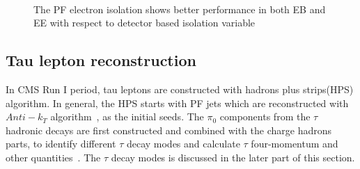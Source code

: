 \begin{figure}[!htbp] 
     \centering
     \\
     \caption[The PF electron isolation shows better performance in both EB and EE with respect to detector based isolation variable]{The PF electron isolation shows better performance in both EB and EE with respect to detector based isolation variable~\cite{electron_reco2015}}
     \label{fig:eleIso}
\end{figure}




\subsection{Tau lepton reconstruction} \label{Chapter:taureco}

In CMS Run I period, tau leptons are constructed with hadrons plus strips(HPS) algorithm. In general, the HPS starts with PF jets which are reconstructed with $Anti-k_{T}$ algorithm~\cite{Cacciari:2008gp}, as the initial seeds. The $\pi_{0}$ components from the $\tau$ hadronic decays are first constructed and combined with the charge hadrons parts, to identify different $\tau$ decay modes and calculate $\tau$ four-momentum and other quantities~\cite{TauIdentiRunI}. The $\tau$ decay modes is discussed in the later part of this section.

